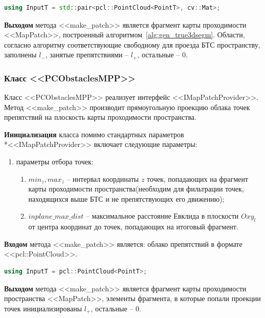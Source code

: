 \begin{lstlisting}[language=C++,numbers=none]
	using InputT = std::pair<pcl::PointCloud<PointT>, cv::Mat>;
\end{lstlisting}

\textbf{Выходом} метода <<make\_patch>> является фрагмент карты проходимости <<MapPatch>>, построенный алгоритмом~\ref{alg:gen_true3dsegm}. Области, согласно алгоритму соответствующие свободному для проезда БТС пространству, заполнены $l_-$, занятые препятствиями -- $l_+$, остальные -- $0$.

\subsubsection{Класс <<PCObstaclesMPP>>}

Класс <<PCObstaclesMPP>> реализует интерфейс <<IMapPatchProvider>>. Метод <<make\_patch>> производит прямоугольную проекцию облака точек препятствий на плоскость карты проходимости пространства.

\textbf{Инициализация} класса помимо стандартных параметров\\*<<IMapPatchProvider>> включает следующие параметры:

\begin{enumerate}
	\item параметры отбора точек:
	\begin{enumerate}
		\item $min_z, max_z$ -- интервал координаты $z$ точек, попадающих на фрагмент карты проходимости пространства(необходим для фильтрации точек, находящихся выше БТС и не препятствующих его движению);
		\item $inplane\_max\_dist$ -- максимальное расстояние Евклида в плоскости $Oxy_l$ от центра координат до точек, попадающих на итоговый фрагмент. 
	\end{enumerate}
\end{enumerate}

\textbf{Входом} метода <<make\_patch>> является: облако препятствий в формате <<pcl::PointCloud>>.

\begin{lstlisting}[language=C++,numbers=none]
	using InputT = pcl::PointCloud<PointT>;
\end{lstlisting}

\textbf{Выходом} метода <<make\_patch>> является фрагмент карты проходимости пространства <<MapPatch>>, элементы фрагмента, в которые попали проекции точек инициализированы $l_+$, остальные -- $0$.

